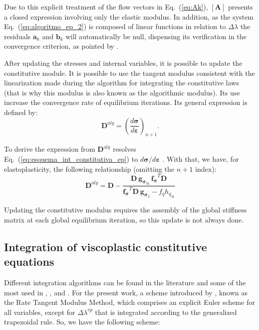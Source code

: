 \documentclass[Journal,letterpaper]{ascelike-new}
\newcommand{\All}{\boldsymbol A}
\newcommand{\al}{\boldsymbol a}
\newcommand{\bl}{\boldsymbol b}
\newcommand{\Dsdee}{\boldsymbol{D}}
\newcommand{\dfds}{\boldsymbol{f_\sigma}}
\newcommand{\hl}{{h_q}}
\newcommand{\dfdq}{{f_q}}
\newcommand{\dgds}{\boldsymbol{g_\sigma}}
\newcommand{\strain}{\boldsymbol{\varepsilon}}
\newcommand{\stress}{\boldsymbol{\sigma}}
\begin{document}
Due to this explicit treatment of the flow vectors in Eq.~(\ref{eq:Ak}), $\left[\All \right]$ presents a closed expression involving only the elastic modulus. In addition, as the system Eq.~(\ref{eq:algoritmo_ep_2}) is composed of linear functions in relation to $\Delta \lambda$ the residuals  $\al_k$ and $\bl_k$ will automatically be null, dispensing its verification in the convergence criterion, as pointed by . 

After updating the stresses and internal variables, it is possible to update the constitutive module. It is possible to use the tangent modulus consistent with the linearization made during the algorithm for integrating the constitutive laws (that is why this modulus is also known as the algorithmic modulus). Its use increase the convergence rate of equilibrium iterations. Its general expression is defined by:
\begin{equation}
	\label{eq:D_alg1}
	\Dsdee^{alg} = \left(\dfrac{d\stress}{d\strain} \right)_{n+1}.
\end{equation}

To derive the expression from $\Dsdee^{alg}$ resolves Eq.~(\ref{eq:esquema_int_constitutiva_ep}) to $d\stress/d\strain$ \cite{belytschko2000}. With that, we have, for elastoplasticity, the following relationship (omitting the $n+1$ index): 
\begin{equation}
	\label{eq:D_alg_ep}
	\Dsdee^{alg} = \Dsdee - \dfrac{\Dsdee~\dgds_n~\dfds^T \Dsdee}{\dfds^T\Dsdee~\dgds_i-\dfdq \hl_n}
\end{equation}

Updating the constitutive modulus requires the assembly of the global stiffness matrix at each global equilibrium iteration, so this update is not always done.


\subsection{Integration of viscoplastic constitutive equations}

Different integration algorithms can be found in the literature and some of the most used in , ,  and . For the present work, a scheme introduced by , known as the Rate Tangent Modulus Method, which comprises an explicit Euler scheme for all variables, except for $\Delta \lambda^{vp}$ that is integrated according to the generalized trapezoidal rule. So, we have the following scheme:
\end{document}
